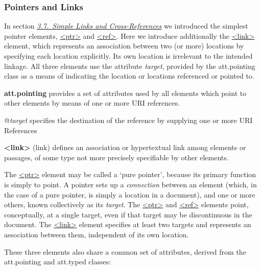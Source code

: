 \subsubsection[{Pointers and Links}]{Pointers and Links}\label{SAPTL}\par
In section \textit{\hyperref[COXR]{3.7.\ Simple Links and Cross-References}} we introduced the simplest pointer elements, \hyperref[TEI.ptr]{<ptr>} and \hyperref[TEI.ref]{<ref>}. Here we introduce additionally the \hyperref[TEI.link]{<link>} element, which represents an association between two (or more) locations by specifying each location explicitly. Its own location is irrelevant to the intended linkage. All three elements use the attribute {\itshape target}, provided by the \textsf{att.pointing} class as a means of indicating the location or locations referenced or pointed to. 
\begin{sansreflist}
  
\item [\textbf{att.pointing}] provides a set of attributes used by all elements which point to other elements by means of one or more URI references.\hfil\\[-10pt]\begin{sansreflist}
    \item[@{\itshape target}]
  specifies the destination of the reference by supplying one or more URI References
\end{sansreflist}  
\item [\textbf{<link>}] (link) defines an association or hypertextual link among elements or passages, of some type not more precisely specifiable by other elements.
\end{sansreflist}
 The \hyperref[TEI.ptr]{<ptr>} element may be called a ‘pure pointer’, because its primary function is simply to point. A pointer sets up a \textit{connection} between an element (which, in the case of a pure pointer, is simply a location in a document), and one or more others, known collectively as its \textit{target}. The \hyperref[TEI.ptr]{<ptr>} and \hyperref[TEI.ref]{<ref>} elements  point, conceptually, at a single target, even if that target may be discontinuous in the document. The \hyperref[TEI.link]{<link>} element  specifies at least two targets and represents an association between them, independent of its own location.\par
These three elements also share a common set of attributes, derived from the \textsf{att.pointing} and \textsf{att.typed} classes: 
